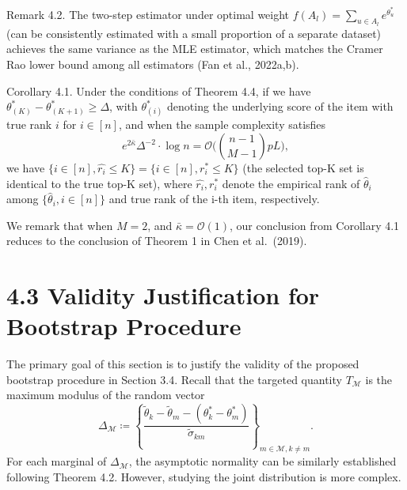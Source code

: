 Remark 4.2. The two-step estimator under optimal weight \(f(A_{l}) = \sum_{u\in A_{l}}e^{\theta_{u}^{*}}\) (can be consistently estimated with a small proportion of a separate dataset) achieves the same variance as the MLE estimator, which matches the Cramer Rao lower bound among all estimators (Fan et al., 2022a,b).

Corollary 4.1. Under the conditions of Theorem 4.4, if we have \(\theta_{(K)}^{*} - \theta_{(K + 1)}^{*}\geq \Delta\), with \(\theta_{(i)}^{*}\) denoting the underlying score of the item with true rank \(i\) for \(i\in [n]\), and when the sample complexity satisfies
\[
e^{2\bar{\kappa}}\Delta^{-2}\cdot \log n = \mathcal{O}\bigg(\binom{n-1}{M-1}pL\bigg),
\]
we have \(\{i\in [n],\widehat{r_{i}}\leq K\} = \{i\in [n],r_{i}^{*}\leq K\}\) (the selected top-K set is identical to the true top-K set), where \(\widehat{r_{i}},r_{i}^{*}\) denote the empirical rank of \(\widehat{\theta}_{i}\) among \(\{\widehat{\theta}_{i},i\in [n]\}\) and true rank of the i-th item, respectively.

We remark that when \(M = 2\), and \(\bar{\kappa} = \mathcal{O}(1)\), our conclusion from Corollary 4.1 reduces to the conclusion of Theorem 1 in Chen et al.~(2019).

\section{4.3 Validity Justification for Bootstrap Procedure}\label{validity-justification-for-bootstrap-procedure}

The primary goal of this section is to justify the validity of the proposed bootstrap procedure in Section 3.4. Recall that the targeted quantity \(T_{\mathcal{M}}\) is the maximum modulus of the random vector
\[
\Delta_{\mathcal{M}}\coloneqq \left\{\frac{\widetilde{\theta}_{k} - \widetilde{\theta}_{m} - (\theta_{k}^{*} - \theta_{m}^{*})}{\widetilde{\sigma}_{km}}\right\}_{m\in \mathcal{M},k\neq m}.
\]
For each marginal of \(\Delta_{\mathcal{M}}\), the asymptotic normality can be similarly established following Theorem 4.2. However, studying the joint distribution is more complex.





